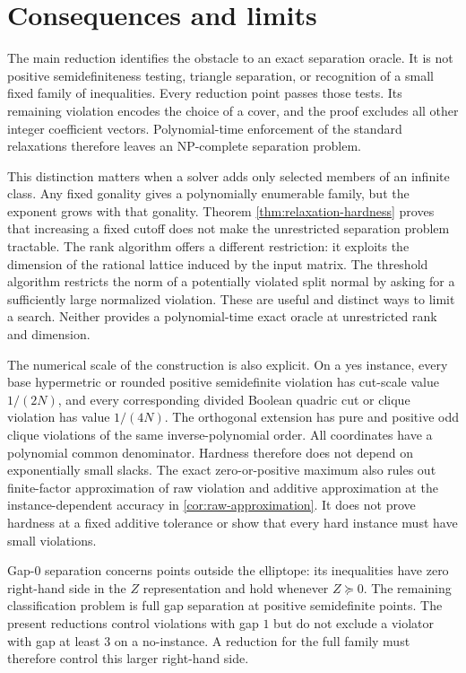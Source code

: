 \section{Consequences and limits}\label{sec:discussion}

The main reduction identifies the obstacle to an exact separation
oracle.  It is not positive semidefiniteness testing, triangle
separation, or recognition of a small fixed family of inequalities.
Every reduction point passes those tests.  Its remaining violation
encodes the choice of a cover, and the proof excludes all other
integer coefficient vectors.  Polynomial-time enforcement of the
standard relaxations therefore leaves an NP-complete separation
problem.

This distinction matters when a solver adds only selected members of
an infinite class.  Any fixed gonality gives a polynomially enumerable
family, but the exponent grows with that gonality.  Theorem
\ref{thm:relaxation-hardness} proves that increasing a fixed cutoff
does not make the unrestricted separation problem tractable.  The
rank algorithm offers a different restriction: it exploits the
dimension of the rational lattice induced by the input matrix.  The
threshold algorithm restricts the norm of a potentially violated
split normal by asking for a sufficiently large normalized violation.
These are useful and distinct ways to limit a search.  Neither
provides a polynomial-time exact oracle at unrestricted rank and
dimension.

The numerical scale of the construction is also explicit.  On a yes
instance, every base hypermetric or rounded positive semidefinite
violation has cut-scale value $1/(2N)$, and every corresponding
divided Boolean quadric cut or clique violation has value $1/(4N)$.
The orthogonal extension has pure and positive odd clique violations
of the same inverse-polynomial order.  All coordinates have a
polynomial common denominator.  Hardness therefore does not depend
on exponentially small slacks.  The exact zero-or-positive maximum
also rules out finite-factor approximation of raw violation and
additive approximation at the instance-dependent accuracy in
\cref{cor:raw-approximation}.  It does not prove hardness at a fixed
additive tolerance or show that every hard instance must have small
violations.

Gap-$0$ separation concerns points outside the elliptope: its
inequalities have zero right-hand side in the $Z$ representation and
hold whenever $Z\succeq0$.  The remaining classification problem is
full gap separation at positive semidefinite points.  The present
reductions control violations with gap $1$ but do not exclude a
violator with gap at least $3$ on a no-instance.  A reduction for the
full family must therefore control this larger right-hand side.
